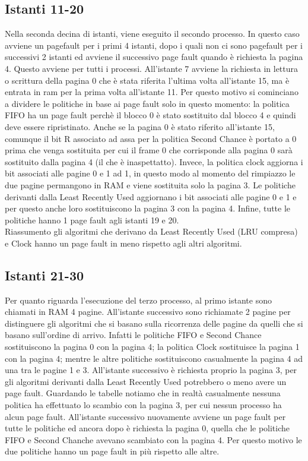 \documentclass[12px]{article}
\begin{document}
\subsection{Istanti 11-20}
Nella seconda decina di istanti, viene eseguito il secondo processo. In questo caso avviene un pagefault per i primi 4 istanti, dopo i quali non ci sono pagefault per i successivi 2 istanti ed avviene il successivo page fault quando è richiesta la pagina 4. Questo avviene per tutti i processi. All'istante 7 avviene la richiesta in lettura o scrittura della pagina 0 che è stata riferita l'ultima volta all'istante 15, ma è entrata in ram per la prima volta all'istante 11. Per questo motivo si cominciano a dividere le politiche in base ai page fault solo in questo momento: la politica FIFO ha un page fault perchè il blocco 0 è stato sostituito dal blocco 4 e quindi deve essere ripristinato. Anche se la pagina 0 è stato riferito all'istante 15, comunque il bit R associato ad assa per la politica Second Chance è portato a 0 prima che venga sostituita per cui il frame 0 che corrisponde alla pagina 0 sarà sostituito dalla pagina 4 (il che è inaspettatto). Invece, la politica clock aggiorna i bit associati alle pagine 0 e 1 ad 1, in questo modo al momento del rimpiazzo le due pagine permangono in RAM e viene sostituita solo la pagina 3. Le politiche derivanti dalla Least Recently Used aggiornano i bit associati alle pagine 0 e 1 e per questo anche loro sostituiscono la pagina 3 con la pagina 4.
Infine, tutte le politiche hanno 1 page fault agli istanti 19 e 20. \\
Riassumento gli algoritmi che derivano da Least Recently Used (LRU compresa) e Clock hanno un page fault in meno rispetto agli altri algoritmi.

\subsection{Istanti 21-30}
Per quanto riguarda l'esecuzione del terzo processo, al primo istante sono chiamati in RAM 4 pagine. All'istante successivo sono richiamate 2 pagine per distinguere gli algoritmi che si basano sulla ricorrenza delle pagine da quelli che si basano sull'ordine di arrivo. Infatti le politiche FIFO e Second Chance sostituiscono la pagina 0 con la pagina 4; la politica Clock sostituisce la pagina 1 con la pagina 4;  mentre le altre politiche sostituiscono casualmente la pagina 4 ad una tra le pagine 1 e 3. All'istante successivo è richiesta proprio la pagina 3, per gli algoritmi derivanti dalla Least Recently Used potrebbero o meno avere un page fault. Guardando le tabelle notiamo che in realtà casualmente nessuna politica ha effettuato lo scambio con la pagina 3, per cui nessun processo ha alcun page fault. All'istante successivo nuovamente avviene un page fault per tutte le politiche ed ancora dopo è richiesta la pagina 0, quella che le politiche FIFO e Second Chanche avevano scambiato con la pagina 4. Per questo motivo le due politiche hanno un page fault in più rispetto alle altre.
\end{document}
